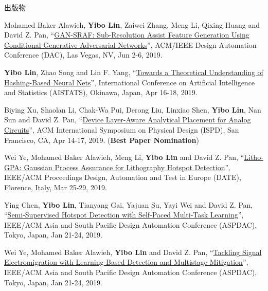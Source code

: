\begin{rSection}{出版物}
\begin{description}[font=\normalfont, rightmargin=2em]
{}
            

\item[{[C25]}]{
        Mohamed Baker Alawieh, \textbf{Yibo Lin}, Zaiwei Zhang, Meng Li, Qixing Huang and David Z. Pan, 
    ``\href{https://doi.org/10.1145/3316781.3317832}{GAN-SRAF: Sub-Resolution Assist Feature Generation Using Conditional Generative Adversarial Networks}'', 
    ACM/IEEE Design Automation Conference (DAC), Las Vegas, NV, Jun 2-6, 2019.
    
}
            

\item[{[C24]}]{
        \textbf{Yibo Lin}, Zhao Song and Lin F. Yang, 
    ``\href{https://arxiv.org/abs/1812.10244}{Towards a Theoretical Understanding of Hashing-Based Neural Nets}'', 
    International Conference on Artificial Intelligence and Statistics (AISTATS), Okinawa, Japan, Apr 16-18, 2019.
    
}
            

\item[{[C23]}]{
        Biying Xu, Shaolan Li, Chak-Wa Pui, Derong Liu, Linxiao Shen, \textbf{Yibo Lin}, Nan Sun and David Z. Pan, 
    ``\href{https://doi.org/10.1145/3299902.3309751}{Device Layer-Aware Analytical Placement for Analog Circuits}'', 
    ACM International Symposium on Physical Design (ISPD), San Francisco, CA, Apr 14-17, 2019.
    (\textbf{Best Paper Nomination})
}
            

\item[{[C22]}]{
        Wei Ye, Mohamed Baker Alawieh, Meng Li, \textbf{Yibo Lin} and David Z. Pan, 
    ``\href{https://doi.org/10.23919/DATE.2019.8714960}{Litho-GPA: Gaussian Process Assurance for Lithography Hotspot Detection}'', 
    IEEE/ACM Proceedings Design, Automation and Test in Europe (DATE), Florence, Italy, Mar 25-29, 2019.
    
}
            

\item[{[C21]}]{
        Ying Chen, \textbf{Yibo Lin}, Tianyang Gai, Yajuan Su, Yayi Wei and David Z. Pan, 
    ``\href{https://doi.org/10.1145/3287624.3287685}{Semi-Supervised Hotspot Detection with Self-Paced Multi-Task Learning}'', 
    IEEE/ACM Asia and South Pacific Design Automation Conference (ASPDAC), Tokyo, Japan, Jan 21-24, 2019.
    
}
            

\item[{[C20]}]{
        Wei Ye, Mohamed Baker Alawieh, \textbf{Yibo Lin} and David Z. Pan, 
    ``\href{https://doi.org/10.1145/3287624.3287688}{Tackling Signal Electromigration with Learning-Based Detection and Multistage Mitigation}'', 
    IEEE/ACM Asia and South Pacific Design Automation Conference (ASPDAC), Tokyo, Japan, Jan 21-24, 2019.
    
}
\end{description}
\end{rSection}

